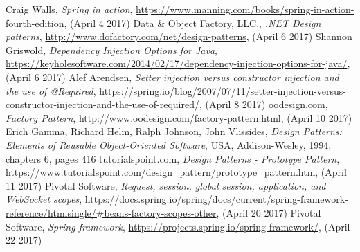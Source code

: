 \documentclass[12pt,a4paper,titlepage]{article}
\begin{document}
\cleardoublepage

\newpage
{}
{}
\begin{thebibliography}{99999}

 Craig Walls, \textit{Spring in action}, \url{https://www.manning.com/books/spring-in-action-fourth-edition}, (April 4 2017)
 Data \& Object Factory, LLC., \textit{.NET Design patterns}, \url{http://www.dofactory.com/net/design-patterns}, (April 6 2017)
 Shannon Griswold, \textit{Dependency Injection Options for Java}, \url{https://keyholesoftware.com/2014/02/17/dependency-injection-options-for-java/}, (April 6 2017)
 Alef Arendsen, \textit{Setter injection versus constructor injection and the use of @Required}, \url{https://spring.io/blog/2007/07/11/setter-injection-versus-constructor-injection-and-the-use-of-required/}, (April 8 2017)
 oodesign.com, \textit{Factory Pattern}, \url{http://www.oodesign.com/factory-pattern.html}, (April 10 2017)
 Erich Gamma, Richard Helm, Ralph Johnson, John Vlissides, \textit{Design Patterns: Elements of Reusable Object-Oriented Software}, USA, Addison-Wesley, 1994, chapters 6, pages 416
 tutorialspoint.com, \textit{Design Patterns - Prototype Pattern}, \url{https://www.tutorialspoint.com/design_pattern/prototype_pattern.htm}, (April 11 2017)
 Pivotal Software, \textit{Request, session, global session, application, and WebSocket scopes}, \url{https://docs.spring.io/spring/docs/current/spring-framework-reference/htmlsingle/#beans-factory-scopes-other}, (April 20 2017)
 Pivotal Software, \textit{Spring framework}, \url{https://projects.spring.io/spring-framework/}, (April 22 2017)


\end{thebibliography}
\cleardoublepage
    
    
\end{document}
